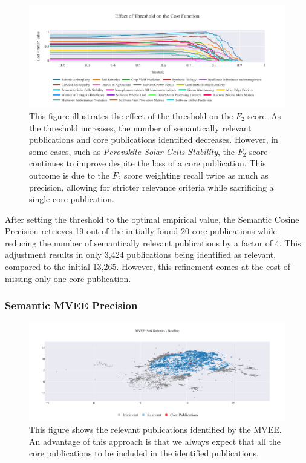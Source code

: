 \begin{figure}[!ht]
	\hspace*{-.5cm}
	\includegraphics[scale=0.58]{pics/threshold-analysis.pdf}
	\caption[Semantic Cosine Threshold: Empirical Analysis]{This figure illustrates the effect of the threshold on the $F_2$ score. As the threshold increases, the number of semantically relevant publications and core publications identified decreases. However, in some cases, such as \textit{Perovskite Solar Cells Stability}, the $F_2$ score continues to improve despite the loss of a core publication. This outcome is due to the $F_2$ score weighting recall twice as much as precision, allowing for stricter relevance criteria while sacrificing a single core publication.}\label{fig:threshold-analysis}
\end{figure}

After setting the threshold to the optimal empirical value, the Semantic Cosine Precision retrieves 19 out of the initially found 20 core publications while reducing the number of semantically relevant publications by a factor of 4. This adjustment results in only 3,424 publications being identified as relevant, compared to the initial 13,265. However, this refinement comes at the cost of missing only one core publication.

\subsubsection{Semantic MVEE Precision}
\newcommand{\eumap}{\mathop{}\!\mathrm{E_{umap}}}
\newcommand{\eo}{\mathop{}\!\mathrm{E_{o}}}
\begin{figure}
	\hspace*{-1cm}	
	\includegraphics[scale=0.45]{pics/sr-mvee-baseline.pdf}
	\caption[Semantic MVEE: Soft Robotics]{This figure shows the relevant publications identified by the MVEE. An advantage of this approach is that we always expect that all the core publications to be included in the identified publications.}\label{fig:sr-mvee-baseline}
\end{figure}

